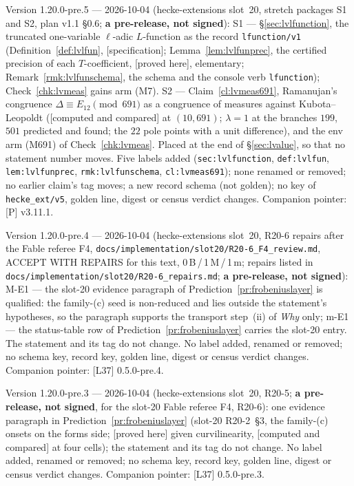 \documentclass[11pt]{article}
\theoremstyle{remark}
\newcommand{\PROVED}{\textsf{[proved here]}}
\newcommand{\CMPD}{\textsf{[computed and compared]}}   %
\newcommand{\SPEC}{\textsf{[specification]}}           %
\begin{document}
Version 1.20.0-pre.5 --- 2026-10-04 (hecke-extensions slot~20, stretch packages S1 and S2, plan v1.1 \S0.6; \textbf{a pre-release, not signed}): S1 --- \S\ref{sec:lvlfunction},
the truncated one-variable $\ell$-adic $L$-function as the record \texttt{lfunction/v1} (Definition~\ref{def:lvlfun}, \SPEC; Lemma~\ref{lem:lvlfunprec}, the certified precision of each
$T$-coefficient, \PROVED, elementary; Remark~\ref{rmk:lvlfunschema}, the schema and the console verb \texttt{lfunction}); Check~\ref{chk:lvmeas} gains arm (M7). S2 --- Claim~\ref{cl:lvmeas691}, Ramanujan's congruence $\Delta\equiv E_{12}\pmod{691}$ as a congruence of
measures against Kubota--Leopoldt (\CMPD{} at $(10,691)$; $\lambda=1$ at the branches $199$, $501$ predicted and found; the $22$ pole points with a unit difference), and the env arm (M691) of
Check~\ref{chk:lvmeas}. Placed at the end of
\S\ref{sec:lvalue}, so that no statement number moves. Five labels added (\texttt{sec:lvlfunction}, \texttt{def:lvlfun}, \texttt{lem:lvlfunprec}, \texttt{rmk:lvlfunschema}, \texttt{cl:lvmeas691}); none renamed or
removed; no earlier claim's tag moves; a new record schema (not golden); no key of \texttt{hecke\_ext/v5}, golden line, digest or census verdict changes. Companion pointer: [P] v3.11.1.

Version 1.20.0-pre.4 --- 2026-10-04 (hecke-extensions slot~20, R20-6 repairs after the Fable referee F4, \texttt{docs/implementation/slot20/R20-6\_F4\_review.md},
ACCEPT WITH REPAIRS for this text, 0\,B\,/\,1\,M\,/\,1\,m; repairs listed in \texttt{docs/implementation/slot20/R20-6\_repairs.md}; \textbf{a pre-release, not signed}): M-E1 --- the
slot-20 evidence paragraph of Prediction~\ref{pr:frobeniuslayer} is qualified: the family-(c) seed is non-reduced and lies outside the statement's hypotheses, so the paragraph supports
the transport step~(ii) of \emph{Why} only; m-E1 --- the status-table row of Prediction~\ref{pr:frobeniuslayer} carries the slot-20 entry. The statement and its tag do not change.
No label added, renamed or removed; no schema key, record key, golden line, digest or census verdict changes. Companion pointer: [L37] 0.5.0-pre.4.

Version 1.20.0-pre.3 --- 2026-10-04 (hecke-extensions slot~20, R20-5; \textbf{a pre-release, not signed}, for the slot-20 Fable referee F4, R20-6): one evidence paragraph in
Prediction~\ref{pr:frobeniuslayer} (slot-20 R20-2~\S3, the family-(c) onsets on the forms side; \PROVED{} given curvilinearity, \CMPD{} at four cells); the statement and its tag do not
change. No label added, renamed or removed; no schema key, record key, golden line, digest or census verdict changes. Companion pointer: [L37] 0.5.0-pre.3.
\end{document}
